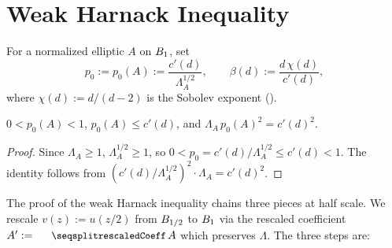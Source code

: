\section{Weak Harnack Inequality}

\begin{definition}
\label{def:p0}
\leanok
{}
For a normalized elliptic $A$ on $B_{1}$, set
\begin{equation*}
  p_0 := p_0(A) := \frac{c'(d)}{\Lambda_A^{1/2}}, \qquad
  \beta(d) := \frac{d\,\chi(d)}{c'(d)},
\end{equation*}
where $\chi(d) := d/(d-2)$ is the Sobolev exponent ().
\end{definition}

\begin{lemma}
\label{lem:p_pos}
\leanok
{}
$0 < p_0(A) < 1$, $p_0(A) \leq c'(d)$, and $\Lambda_A\,p_0(A)^2 = c'(d)^2$.
\end{lemma}

\begin{proof}
\leanok
{}

Since $\Lambda_A \geq 1$, $\Lambda_A^{1/2} \geq 1$, so
$0 < p_0 = c'(d)/\Lambda_A^{1/2} \leq c'(d) < 1$. The identity follows from
$(c'(d)/\Lambda_A^{1/2})^2 \cdot \Lambda_A = c'(d)^2$.
\end{proof}

The proof of the weak Harnack inequality chains three pieces at half scale.
We rescale $v(z) := u(z/2)$ from $B_{1/2}$ to $B_{1}$ via the rescaled
coefficient $A' := \leanname{rescaledCoeff}\,A$ which preserves $\Lambda$.
The three steps are:

